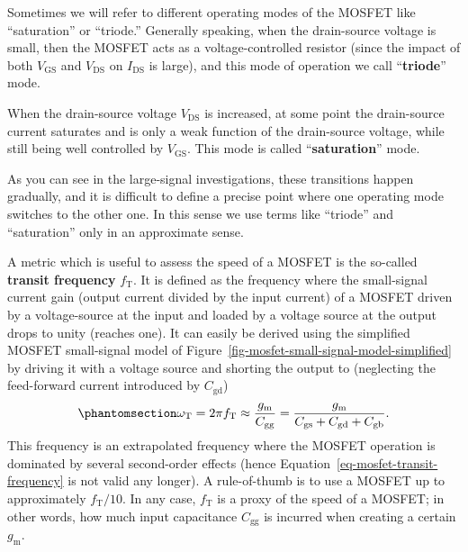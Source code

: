 \documentclass[
  a4paper,
  DIV=11,
  numbers=noendperiod]{scrartcl}
\begin{document}
\begin{tcolorbox}[enhanced jigsaw, titlerule=0mm, left=2mm, coltitle=black, toprule=.15mm, breakable, opacitybacktitle=0.6, colframe=quarto-callout-note-color-frame, bottomtitle=1mm, toptitle=1mm, opacityback=0, colbacktitle=quarto-callout-note-color!10!white, title=\textcolor{quarto-callout-note-color}{\faInfo}\hspace{0.5em}{MOSFET Triode and Saturation Region}, arc=.35mm, rightrule=.15mm, colback=white, bottomrule=.15mm, leftrule=.75mm]

Sometimes we will refer to different operating modes of the MOSFET like
``saturation'' or ``triode.'' Generally speaking, when the drain-source
voltage is small, then the MOSFET acts as a voltage-controlled resistor
(since the impact of both \(V_\mathrm{GS}\) and \(V_\mathrm{DS}\) on
\(I_\mathrm{DS}\) is large), and this mode of operation we call
``\textbf{triode}'' mode.

When the drain-source voltage \(V_\mathrm{DS}\) is increased, at some
point the drain-source current saturates and is only a weak function of
the drain-source voltage, while still being well controlled by
\(V_\mathrm{GS}\). This mode is called ``\textbf{saturation}'' mode.

As you can see in the large-signal investigations, these transitions
happen gradually, and it is difficult to define a precise point where
one operating mode switches to the other one. In this sense we use terms
like ``triode'' and ``saturation'' only in an approximate sense.

\end{tcolorbox}

A metric which is useful to assess the speed of a MOSFET is the
so-called \textbf{transit frequency} \(f_\mathrm{T}\). It is defined as
the frequency where the small-signal current gain (output current
divided by the input current) of a MOSFET driven by a voltage-source at
the input and loaded by a voltage source at the output drops to unity
(reaches one). It can easily be derived using the simplified MOSFET
small-signal model of
Figure~\ref{fig-mosfet-small-signal-model-simplified} by driving it with
a voltage source and shorting the output to (neglecting the feed-forward
current introduced by \(C_\mathrm{gd}\))
\begin{equation}\phantomsection\label{eq-mosfet-transit-frequency}{
\omega_\mathrm{T} = 2 \pi f_\mathrm{T} \approx \frac{g_\mathrm{m}}{C_\mathrm{gg}} = \frac{g_\mathrm{m}}{C_\mathrm{gs}+ C_\mathrm{gd}+ C_\mathrm{gb}}.
}\end{equation} This frequency is an extrapolated frequency where the
MOSFET operation is dominated by several second-order effects (hence
Equation~\ref{eq-mosfet-transit-frequency} is not valid any longer). A
rule-of-thumb is to use a MOSFET up to approximately
\(f_\mathrm{T} / 10\). In any case, \(f_\mathrm{T}\) is a proxy of the
speed of a MOSFET; in other words, how much input capacitance
\(C_\mathrm{gg}\) is incurred when creating a certain \(g_\mathrm{m}\).
\end{document}
